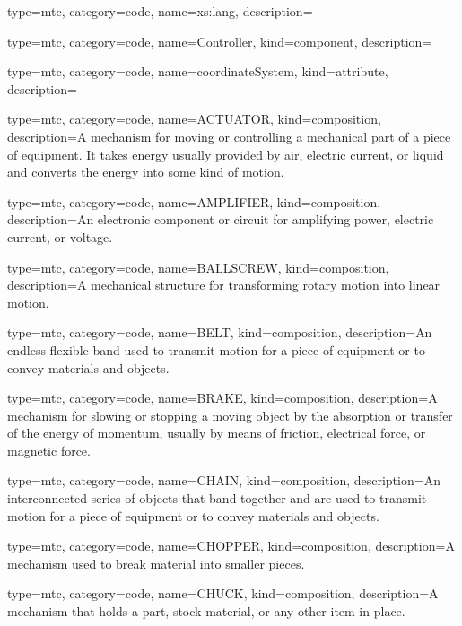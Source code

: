{
  type=mtc,
  category=code,
  name={xs:lang},
  description={}
}


{
  type=mtc,
  category=code,
  name={Controller},
  kind={component},
  description= {}
}


{
  type=mtc,
  category=code,
  name={coordinateSystem},
  kind={attribute},
  description={}
}


{
  type=mtc,
  category=code,
  name={ACTUATOR},
  kind={composition},
  description={A mechanism for moving or controlling a mechanical part of a piece of equipment.   \newline It takes energy usually provided by air, electric current, or liquid and converts the energy into some kind of motion.  }
}


{
  type=mtc,
  category=code,
  name={AMPLIFIER},
  kind={composition},
  description={An electronic component or circuit for amplifying power, electric current, or voltage.}
}


{
  type=mtc,
  category=code,
  name={BALLSCREW},
  kind={composition},
  description={A mechanical structure for transforming rotary motion into linear motion.}
}


{
  type=mtc,
  category=code,
  name={BELT},
  kind={composition},
  description={An endless flexible band used to transmit motion for a piece of equipment or to convey materials and objects.}
}


{
  type=mtc,
  category=code,
  name={BRAKE},
  kind={composition},
  description={A mechanism for slowing or stopping a moving object by the absorption or transfer of the energy of momentum, usually by means of friction, electrical force, or magnetic force.}
}


{
  type=mtc,
  category=code,
  name={CHAIN},
  kind={composition},
  description={An interconnected series of objects that band together and are used to transmit motion for a piece of equipment or to convey materials and objects.}
}


{
  type=mtc,
  category=code,
  name={CHOPPER},
  kind={composition},
  description={A mechanism used to break material into smaller pieces.}
}


{
  type=mtc,
  category=code,
  name={CHUCK},
  kind={composition},
  description={A mechanism that holds a part, stock material, or any other item in place.}
}


